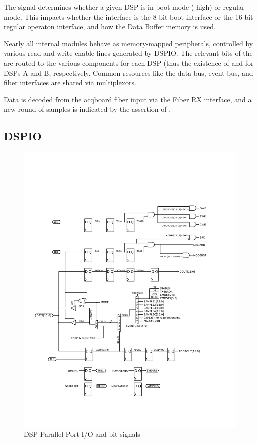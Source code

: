 The  signal determines whether a given DSP is in boot
mode ( high) or regular mode. This impacts whether the
interface is the 8-bit boot interface or the 16-bit regular operaton
interface, and how the Data Buffer memory is used.
  
Nearly all internal modules behave as memory-mapped peripherals,
controlled by various read and write-enable lines generated by DSPIO.
The relevant bits of the  are routed to the various
components for each DSP (thus the existence of 
and  for DSPs A and B, respectively. Common
resources like the data bus, event bus, and fiber interfaces are
shared via multiplexors.
  
Data is decoded from the acqboard fiber input via the Fiber RX
interface, and a new round of samples is indicated by the assertion of
.

\subsection{DSPIO}

\begin{figure}[h!]
\includegraphics[scale=0.8]{DSPIO.svg}
\caption{DSP Parallel Port I/O and bit signals}
\label{DSPIO}
\end{figure}

